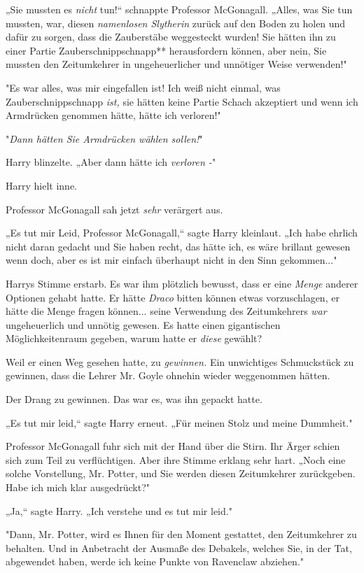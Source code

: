 {„Sie mussten es \emph{nicht} tun!“ schnappte Professor McGonagall. „Alles, was Sie tun mussten, war, diesen \emph{namenlosen Slytherin} zurück auf den Boden zu holen und dafür zu sorgen, dass die Zauberstäbe weggesteckt wurden! Sie hätten ihn zu einer Partie Zauberschnippschnapp** herausfordern können, aber nein, Sie mussten den Zeitumkehrer in ungeheuerlicher und unnötiger Weise verwenden!"

"Es war alles, was mir eingefallen ist! Ich weiß nicht einmal, was Zauberschnippschnapp \emph{ist,} sie hätten keine Partie Schach akzeptiert und wenn ich Armdrücken genommen hätte, hätte ich verloren!"

"\emph{Dann hätten Sie Armdrücken wählen sollen!}"

Harry blinzelte. „Aber dann hätte ich \emph{verloren -}"

Harry hielt inne.

Professor McGonagall sah jetzt \emph{sehr} verärgert aus.

„Es tut mir Leid, Professor McGonagall,“ sagte Harry kleinlaut. „Ich habe ehrlich nicht daran gedacht und Sie haben recht, das hätte ich, es wäre brillant gewesen wenn doch, aber es ist mir einfach überhaupt nicht in den Sinn gekommen..."

Harrys Stimme erstarb. Es war ihm plötzlich bewusst, dass er eine \emph{Menge} anderer Optionen gehabt hatte. Er hätte \emph{Draco} bitten können etwas vorzuschlagen, er hätte die Menge fragen können... seine Verwendung des Zeitumkehrers \emph{war} ungeheuerlich und unnötig gewesen. Es hatte einen gigantischen Möglichkeitenraum gegeben, warum hatte er \emph{diese} gewählt?

Weil er einen Weg gesehen hatte, zu \emph{gewinnen.} Ein unwichtiges Schmuckstück zu gewinnen, dass die Lehrer Mr. Goyle ohnehin wieder weggenommen hätten.

Der Drang zu gewinnen. Das war es, was ihn gepackt hatte.

„Es tut mir leid,“ sagte Harry erneut. „Für meinen Stolz und meine Dummheit."

Professor McGonagall fuhr sich mit der Hand über die Stirn. Ihr Ärger schien sich zum Teil zu verflüchtigen. Aber ihre Stimme erklang sehr hart. „Noch eine solche Vorstellung, Mr. Potter, und Sie werden diesen Zeitumkehrer zurückgeben. Habe ich mich klar ausgedrückt?"

„Ja,“ sagte Harry. „Ich verstehe und es tut mir leid."

"Dann, Mr. Potter, wird es Ihnen für den Moment gestattet, den Zeitumkehrer zu behalten. Und in Anbetracht der Ausmaße des Debakels, welches Sie, in der Tat, abgewendet haben, werde ich keine Punkte von Ravenclaw abziehen."

}
